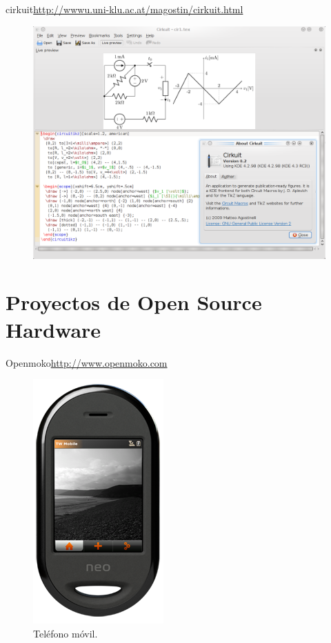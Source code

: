 \documentclass{beamer}
\begin{document}
\begin{frame}{cirkuit}{\url{http://wwwu.uni-klu.ac.at/magostin/cirkuit.html}}
  \begin{figure}
    \includegraphics[scale=0.35]{img/cirkuit1.png}
  \end{figure}
\end{frame}


\section{Proyectos de Open Source Hardware}


\begin{frame}{Openmoko}{\url{http://www.openmoko.com}}
  \begin{figure}
    \includegraphics[scale=0.65]{img/freerunner_shop1}
    \caption{Teléfono móvil.}
    \label{fig:openmoko}
  \end{figure}
\end{frame}
\end{document}
